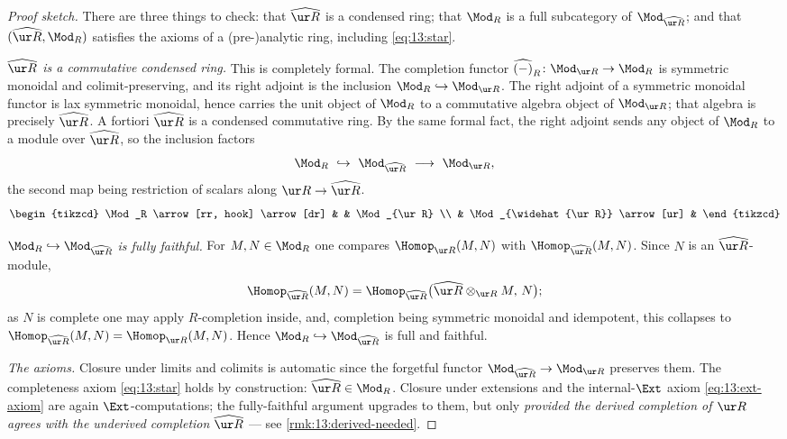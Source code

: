 \begin{proof}[Proof sketch]
There are three things to check: that $\widehat{\ur R}$ is a condensed ring;
that $\Mod_R$ is a full subcategory of $\Mod_{\widehat{\ur R}}$; and that
$(\widehat{\ur R},\Mod_R)$ satisfies the axioms of a (pre-)analytic ring,
including \eqref{eq:13:star}.

\emph{$\widehat{\ur R}$ is a commutative condensed ring.} This is completely
formal. The completion functor
$\widehat{(-)}_R\colon\Mod_{\ur R}\to\Mod_R$ is symmetric monoidal and
colimit-preserving, and its right adjoint is the inclusion
$\Mod_R\hookrightarrow\Mod_{\ur R}$. The right adjoint of a symmetric monoidal
functor is lax symmetric monoidal, hence carries the unit object of $\Mod_R$ to a
commutative algebra object of $\Mod_{\ur R}$; that algebra is precisely
$\widehat{\ur R}$. A fortiori $\widehat{\ur R}$ is a condensed commutative ring.
By the same formal fact, the right adjoint sends any object of $\Mod_R$ to a
module over $\widehat{\ur R}$, so the inclusion factors
\begin{equation*}
\Mod_R\ \hookrightarrow\ \Mod_{\widehat{\ur R}}\ \longrightarrow\ \Mod_{\ur R},
\end{equation*}
the second map being restriction of scalars along $\ur R\to\widehat{\ur R}$.
\[
\begin{tikzcd}
\Mod_R \arrow[rr, hook] \arrow[dr] & & \Mod_{\ur R} \\
& \Mod_{\widehat{\ur R}} \arrow[ur] &
\end{tikzcd}
\]

\emph{$\Mod_R\hookrightarrow\Mod_{\widehat{\ur R}}$ is fully faithful.} For
$M,N\in\Mod_R$ one compares $\Homop_{\ur R}(M,N)$ with
$\Homop_{\widehat{\ur R}}(M,N)$. Since $N$ is an $\widehat{\ur R}$-module,
\[
\Homop_{\widehat{\ur R}}(M,N)=\Homop_{\widehat{\ur R}}\big(\widehat{\ur R}\otimes_{\ur R}M,\,N\big);
\]
as $N$ is complete one may apply $R$-completion inside, and, completion being
symmetric monoidal and idempotent, this collapses to $\Homop_{\widehat{\ur R}}(M,N)=\Homop_{\ur R}(M,N)$. Hence
$\Mod_R\hookrightarrow\Mod_{\widehat{\ur R}}$ is full and faithful.

\emph{The axioms.} Closure under limits and colimits is automatic since the
forgetful functor $\Mod_{\widehat{\ur R}}\to\Mod_{\ur R}$ preserves them. The
completeness axiom \eqref{eq:13:star} holds by construction:
$\widehat{\ur R}\in\Mod_R$. Closure under extensions and the internal-$\Ext$
axiom \eqref{eq:13:ext-axiom} are again $\Ext$-computations; the fully-faithful
argument upgrades to them, but only \emph{provided the derived completion of
$\ur R$ agrees with the underived completion} $\widehat{\ur R}$ --- see
\cref{rmk:13:derived-needed}.
\end{proof}

